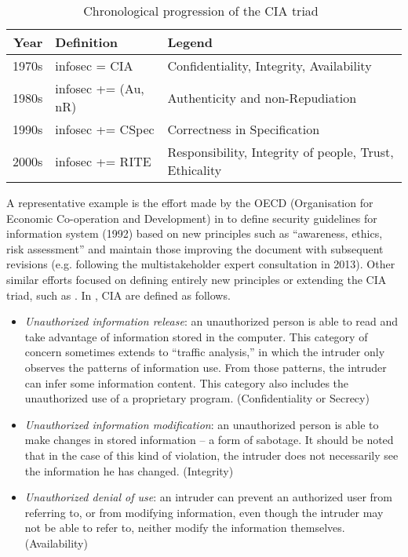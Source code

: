 \begin{table}[h]
\centering
\small
\begin{tabular}{rll} 
	{\bf Year} & {\bf Definition} & {\bf Legend}\\
	\hline
	1970s & infosec = CIA & Confidentiality, Integrity, Availability\\
	1980s & infosec += (Au, nR) & Authenticity and non-Repudiation\\
	1990s & infosec += CSpec & Correctness in Specification\\
	2000s & infosec += RITE & Responsibility, Integrity of people, Trust, Ethicality
\end{tabular}
\caption{Chronological progression of the CIA triad~\label{tab:ciaevolution}}
\end{table}


A representative example is the effort made by the OECD (Organisation for Economic
Co-operation and Development) in \autocite{OECD2013guidelines} to define
security guidelines for information system (1992) based on new principles such
as ``awareness, ethics, risk assessment'' and maintain those improving the document with
subsequent revisions 
(e.g.  following the multistakeholder expert consultation in 2013).
Other similar efforts focused on defining entirely new principles or extending
the CIA triad, such as \autocite{NISTSP800-160}. 
In \autocite{Anderson1972report,Samonas2014cia}, CIA are defined as follows.
\begin{itemize}
	\item \emph{Unauthorized information release}: an unauthorized person is able
		to read and take  advantage  of  information  stored  in  the
		computer.  This  category of concern  sometimes  extends  to
		``traffic  analysis,''  in  which  the intruder  only observes
		the  patterns  of  information  use.  From  those patterns,
		the  intruder can   infer   some   information   content.
		This category   also   includes   the unauthorized use of a
		proprietary program.  (Confidentiality or Secrecy) 
	\item \emph{Unauthorized  information  modification}:  an  unauthorized person
		is  able  to make changes in stored information -- a form  of
		sabotage.  It should be noted that in the case of this kind of
		violation, the intruder does not necessarily see the
		information he has changed.  (Integrity)
	\item \emph{Unauthorized  denial  of  use}:  an  intruder  can  prevent  an
		authorized  user  from referring to, or from modifying
		information, even though the intruder may not be able to refer
		to, neither modify the information themselves. (Availability)
\end{itemize}

